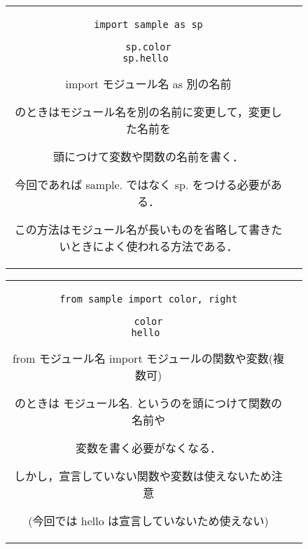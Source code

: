 \documentclass{jsarticle}
\begin{document}
\begin{figure}[h]
	\begin{tabular}{cc}
		\begin{minipage}[t]{.4\textwidth}
			\begin{lstlisting}[caption=インポートの仕方-その2]
import sample as sp

sp.color
sp.hello \end{lstlisting}
		\end{minipage} \hspace{5mm}
		\begin{minipage}[t]{.6\textwidth}
			\begin{screen}
				import モジュール名 as 別の名前 \par
				のときはモジュール名を別の名前に変更して，変更した名前を\par 頭につけて変数や関数の名前を書く． \par
				今回であれば sample. ではなく sp. をつける必要がある． \par
				この方法はモジュール名が長いものを省略して書きたいときによく使われる方法である．
			\end{screen}
		\end{minipage}
	\end{tabular}
\end{figure}

\begin{figure}[h]
	\begin{tabular}{cc}
		\begin{minipage}[t]{.4\textwidth}
			\begin{lstlisting}[caption=インポートの仕方-その3]
from sample import color, right

color
hello \end{lstlisting}
		\end{minipage} \hspace{5mm}
		\begin{minipage}[t]{.6\textwidth}
			\begin{screen}
				from モジュール名 import モジュールの関数や変数(複数可) \par
				のときは モジュール名. というのを頭につけて関数の名前や\par 変数を書く必要がなくなる．\par
				しかし，宣言していない関数や変数は使えないため注意\par (今回では hello は宣言していないため使えない)
			\end{screen}
		\end{minipage}
	\end{tabular}
\end{figure}
\end{document}
